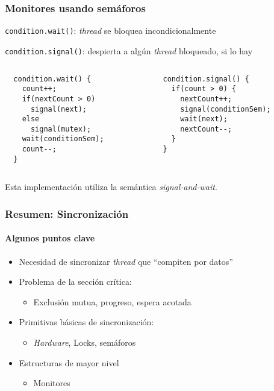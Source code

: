 \documentclass[letter]{beamer}
\begin{document}
\begin{frame}[fragile]
  \frametitle{Monitores usando semáforos}

  {\tt condition.wait()}: {\em thread} se bloquea incondicionalmente

  {\tt condition.signal()}: despierta a algún {\em thread} bloqueado, si lo hay
  
    \begin{columns}[c]
    \begin{column}[T]{5cm}
\begin{verbatim}
  condition.wait() {
    count++;
    if(nextCount > 0)
      signal(next);
    else
      signal(mutex);
    wait(conditionSem);
    count--;
  }  
\end{verbatim}
    \end{column}
    \begin{column}[T]{5cm}
\begin{verbatim}
  condition.signal() {
    if(count > 0) {
      nextCount++;
      signal(conditionSem);
      wait(next);
      nextCount--;
    }
  }
\end{verbatim}
    \end{column}
    \end{columns}

Esta implementación utiliza la semántica {\em signal-and-wait}.

\end{frame}


\begin{frame}
  \frametitle{Resumen: Sincronización}
  \framesubtitle{Algunos puntos clave}

  \begin{itemize}
    \item Necesidad de sincronizar {\em thread} que ``compiten por datos''
    \item Problema de la sección crítica:
      \begin{itemize}
        \item Exclusión mutua, progreso, espera acotada
      \end{itemize}
    \item Primitivas básicas de sincronización:
      \begin{itemize}
        \item {\em Hardware}, Locks, semáforos
      \end{itemize}
    \item Estructuras de mayor nivel
      \begin{itemize}
        \item Monitores
      \end{itemize}
  \end{itemize}

\end{frame}
\end{document}
